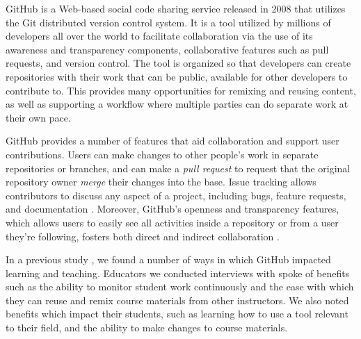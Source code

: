 GitHub is a Web-based social code sharing service released in 2008 that utilizes the Git distributed version control system. It is a tool utilized by millions of developers all over the world to facilitate collaboration via the use of its awareness and transparency components, collaborative features such as pull requests, and version control. The tool is organized so that developers can create repositories with their work that can be public, available for other developers to contribute to. This provides many opportunities for remixing and reusing content, as well as supporting a workflow where multiple parties can do separate work at their own pace.

GitHub provides a number of features that aid collaboration and support user contributions. Users can make changes to other people's work in separate repositories or branches, and can make a \emph{pull request} to request that the original repository owner \emph{merge} their changes into the base. Issue tracking allows contributors to discuss any aspect of a project, including bugs, feature requests, and documentation \cite{BissyandeEtc}. Moreover, GitHub's openness and transparency features, which allows users to easily see all activities inside a repository or from a user they're following, fosters both direct and indirect collaboration \cite{dabbish2012social}.

In a previous study \cite{zagalsky2015emergence}, we found a number of ways in which GitHub impacted learning and teaching. Educators we conducted interviews with spoke of benefits such as the ability to monitor student work continuously and the ease with which they can reuse and remix course materials from other instructors. We also noted benefits which impact their students, such as learning how to use a tool relevant to their field, and the ability to make changes to course materials.
